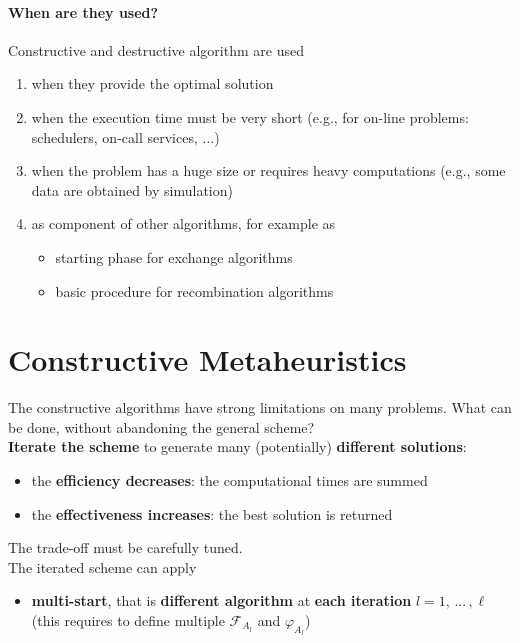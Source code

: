 \documentclass[11pt]{article}
\begin{document}
	\paragraph{When are they used?} Constructive and destructive algorithm are used
	\begin{enumerate}
		\item when they provide the optimal solution
		
		\item when the execution time must be very short (e.g., for on-line problems: schedulers, on-call services, ...)
		
		\item when the problem has a huge size or requires heavy computations (e.g., some data are obtained by simulation)
		
		\item as component of other algorithms, for example as
		\begin{itemize}
			\item starting phase for exchange algorithms
			\item basic procedure for recombination algorithms
		\end{itemize}
	\end{enumerate}
	
	
	\section{Constructive Metaheuristics}
	
	The constructive algorithms have strong limitations on many problems. What can be done, without abandoning the general scheme? \\
	
	\textbf{Iterate the scheme} to generate many (potentially) \textbf{different solutions}:
	\begin{itemize}
		\item the \textbf{efficiency decreases}: the computational times are summed
		\item the \textbf{effectiveness increases}: the best solution is returned
	\end{itemize}
	
	The trade-off must be carefully tuned.\\
	
	The iterated scheme can apply
	\begin{itemize}
		\item \textbf{multi-start}, that is \textbf{different algorithm} at \textbf{each iteration} $l = 1,\, ... \, , \ell$ (this requires to define multiple $\mathcal{F}_{A_l}$ and $\varphi_{A_l}$)
	\end{itemize}
	
\end{document}
